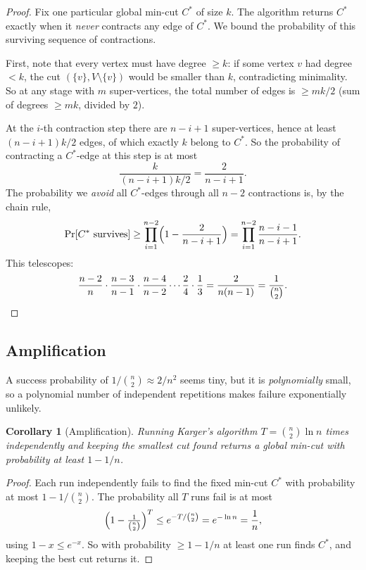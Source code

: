 \documentclass[11pt]{article}
\newtheorem{corollary}[theorem]{Corollary}
\begin{document}
\begin{proof}
Fix one particular global min-cut $C^*$ of size $k$. The algorithm returns $C^*$
exactly when it \emph{never} contracts any edge of $C^*$. We bound the probability
of this surviving sequence of contractions.

First, note that every vertex must have degree $\ge k$: if some vertex $v$ had
degree $< k$, the cut $(\{v\}, V\setminus\{v\})$ would be smaller than $k$,
contradicting minimality. So at any stage with $m$ super-vertices, the total number
of edges is $\ge mk/2$ (sum of degrees $\ge mk$, divided by $2$).

At the $i$-th contraction step there are $n - i + 1$ super-vertices, hence at least
$(n-i+1)k/2$ edges, of which exactly $k$ belong to $C^*$. So the probability of
contracting a $C^*$-edge at this step is at most
\[
    \frac{k}{(n-i+1)k/2} = \frac{2}{n-i+1}.
\]
The probability we \emph{avoid} all $C^*$-edges through all $n-2$ contractions is,
by the chain rule,
\[
    \Pr[C^* \text{ survives}] \ge \prod_{i=1}^{n-2}\Bigl(1 - \frac{2}{n-i+1}\Bigr)
    = \prod_{i=1}^{n-2}\frac{n-i-1}{n-i+1}.
\]
This telescopes:
\[
    \frac{n-2}{n}\cdot\frac{n-3}{n-1}\cdot\frac{n-4}{n-2}\cdots\frac{2}{4}\cdot\frac{1}{3}
    = \frac{2}{n(n-1)} = \frac{1}{\binom{n}{2}}. \qedhere
\]
\end{proof}

\subsection{Amplification}

A success probability of $1/\binom{n}{2} \approx 2/n^2$ seems tiny, but it is
\emph{polynomially} small, so a polynomial number of independent repetitions makes
failure exponentially unlikely.

\begin{corollary}[Amplification]
\label{cor:karger-amp}
Running Karger's algorithm $T = \binom{n}{2}\ln n$ times independently and keeping
the smallest cut found returns a global min-cut with probability at least $1 -
1/n$.
\end{corollary}

\begin{proof}
Each run independently fails to find the fixed min-cut $C^*$ with probability at
most $1 - 1/\binom{n}{2}$. The probability all $T$ runs fail is at most
\[
    \Bigl(1 - \tfrac{1}{\binom{n}{2}}\Bigr)^{T} \le e^{-T/\binom{n}{2}} = e^{-\ln n} = \frac1n,
\]
using $1 - x \le e^{-x}$. So with probability $\ge 1 - 1/n$ at least one run finds
$C^*$, and keeping the best cut returns it.
\end{proof}
\end{document}
